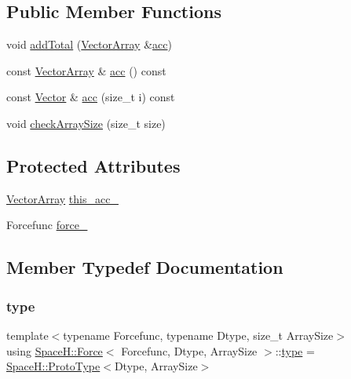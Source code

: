\subsection*{Public Member Functions}
\begin{DoxyCompactItemize}
\item 
void \mbox{\hyperlink{struct_space_h_1_1_force_a9f85a2d5e3e642c6e1121c591c19dded}{add\+Total}} (\mbox{\hyperlink{struct_space_h_1_1_force_aa58fd21903006c1d033713d04b4719f3}{Vector\+Array}} \&\mbox{\hyperlink{struct_space_h_1_1_force_ac4f8ce97d4513859ad94064ed35ab300}{acc}})
\item 
const \mbox{\hyperlink{struct_space_h_1_1_force_aa58fd21903006c1d033713d04b4719f3}{Vector\+Array}} \& \mbox{\hyperlink{struct_space_h_1_1_force_ac4f8ce97d4513859ad94064ed35ab300}{acc}} () const
\item 
const \mbox{\hyperlink{struct_space_h_1_1_force_a7da326c7793f559bb39c73b6d0d01e39}{Vector}} \& \mbox{\hyperlink{struct_space_h_1_1_force_abff837e46b01461762054d79ebee0fb8}{acc}} (size\+\_\+t i) const
\item 
void \mbox{\hyperlink{struct_space_h_1_1_force_aa1a3ef23a57eb72d0004c4afe505eb0b}{check\+Array\+Size}} (size\+\_\+t size)
\end{DoxyCompactItemize}
\subsection*{Protected Attributes}
\begin{DoxyCompactItemize}
\item 
\mbox{\hyperlink{struct_space_h_1_1_force_aa58fd21903006c1d033713d04b4719f3}{Vector\+Array}} \mbox{\hyperlink{struct_space_h_1_1_force_a7e87abc40a345bc5e24bdf56ca32f045}{this\+\_\+acc\+\_\+}}
\item 
Forcefunc \mbox{\hyperlink{struct_space_h_1_1_force_a9d669e983d78f8bfa0e1a08dd27b6abb}{force\+\_\+}}
\end{DoxyCompactItemize}


\subsection{Member Typedef Documentation}
\mbox{\label{struct_space_h_1_1_force_a151c6ae1ec7ad87825c2b6cc74aee5f2}} 
\subsubsection{\texorpdfstring{type}{type}}
{\footnotesize\ttfamily template$<$typename Forcefunc, typename Dtype, size\+\_\+t Array\+Size$>$ \\
using \mbox{\hyperlink{struct_space_h_1_1_force}{Space\+H\+::\+Force}}$<$ Forcefunc, Dtype, Array\+Size $>$\+::\mbox{\hyperlink{struct_space_h_1_1_force_a151c6ae1ec7ad87825c2b6cc74aee5f2}{type}} =  \mbox{\hyperlink{struct_space_h_1_1_proto_type}{Space\+H\+::\+Proto\+Type}}$<$Dtype, Array\+Size$>$}

